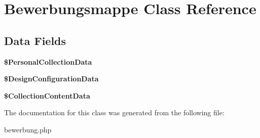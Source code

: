 \hypertarget{class_bewerbungsmappe}{\section{Bewerbungsmappe Class Reference}
\label{class_bewerbungsmappe}
}
\subsection*{Data Fields}
\begin{DoxyCompactItemize}
\item 
\hypertarget{class_bewerbungsmappe_a2ffc34289ef798a527cff1bdb3be132a}{{\bfseries \$\-Personal\-Collection\-Data}}\label{class_bewerbungsmappe_a2ffc34289ef798a527cff1bdb3be132a}

\item 
\hypertarget{class_bewerbungsmappe_a20f7ad935a6dde66d96e3f33ea68f806}{{\bfseries \$\-Design\-Configuration\-Data}}\label{class_bewerbungsmappe_a20f7ad935a6dde66d96e3f33ea68f806}

\item 
\hypertarget{class_bewerbungsmappe_afb2bb7781ca41755836ef4f73546f8ab}{{\bfseries \$\-Collection\-Content\-Data}}\label{class_bewerbungsmappe_afb2bb7781ca41755836ef4f73546f8ab}

\end{DoxyCompactItemize}


The documentation for this class was generated from the following file\-:\begin{DoxyCompactItemize}
\item 
bewerbung.\-php\end{DoxyCompactItemize}
